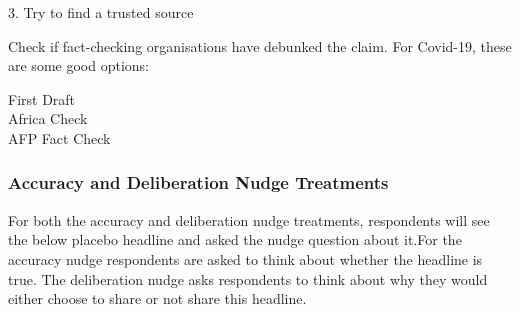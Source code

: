 \documentclass[letterpaper, 12pt, parskip=full,]{scrartcl}
\begin{document}
3. Try to find a trusted source

Check if fact-checking organisations have debunked the claim. For Covid-19, these are some good options:

First Draft\\
Africa Check\\
AFP Fact Check

\subsubsection{Accuracy and Deliberation Nudge Treatments}\label{sec:nudge}

For both the accuracy and deliberation nudge treatments, respondents will see the below placebo headline and asked the nudge question about it.For the accuracy nudge respondents are asked to think about whether the headline is true. The deliberation nudge asks respondents to think about why they would either choose to share or not share this headline.
\end{document}
